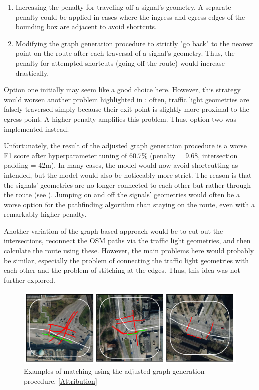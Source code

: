 \begin{enumerate}
    \item Increasing the penalty for traveling off a signal's geometry. A separate penalty could be applied in cases where the ingress and egress edges of the bounding box are adjacent to avoid shortcuts.
    \item  Modifying the graph generation procedure to strictly "go back" to the nearest point on the route after each traversal of a signal's geometry. Thus, the penalty for attempted shortcuts (going off the route) would increase drastically.
\end{enumerate}

Option one initially may seem like a good choice here. However, this strategy would worsen another problem highlighted in : often, traffic light geometries are falsely traversed simply because their exit point is slightly more proximal to the egress point. A higher penalty amplifies this problem. Thus, option two was implemented instead. 

Unfortunately, the result of the adjusted graph generation procedure is a worse F1 score after hyperparameter tuning of 60.7\% (penalty = 9.68, intersection padding = 42m). In many cases, the model would now avoid shortcutting as intended, but the model would also be noticeably more strict. The reason is that the signals' geometries are no longer connected to each other but rather through the route (see ). Jumping on and off the signals' geometries would often be a worse option for the pathfinding algorithm than staying on the route, even with a remarkably higher penalty. 

Another variation of the graph-based approach would be to cut out the intersections, reconnect the OSM paths via the traffic light geometries, and then calculate the route using these. However, the main problems here would probably be similar, especially the problem of connecting the traffic light geometries with each other and the problem of stitching at the edges. Thus, this idea was not further explored.

\begin{figure}[t]
\centering
\includegraphics[width=\linewidth]{images/matching-dijkstra-strict.pdf}
\caption{Examples of matching using the adjusted graph generation procedure. [\hyperref[attribution]{Attribution}]}
\label{fig:sg-selection-graph-strict}
\end{figure}

